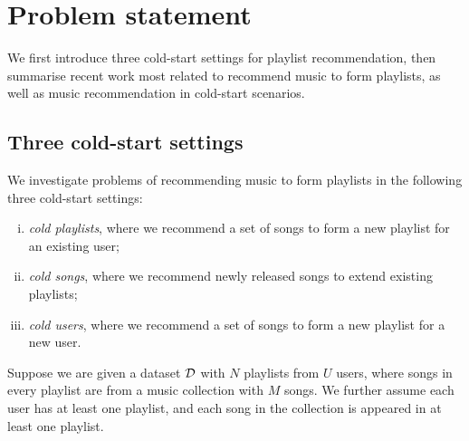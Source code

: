 \section{Problem statement}
\label{sec:problem}

We first introduce three cold-start settings for playlist recommendation, 
then summarise recent work most related to recommend music to form playlists,
as well as music recommendation in cold-start scenarios.



\subsection{Three cold-start settings}

We investigate problems of recommending music to form playlists in the following three cold-start settings:
\begin{enumerate}[(i)]
\item \emph{cold playlists}, where we recommend a set of songs to form a new playlist for an existing user;
\item \emph{cold songs}, where we recommend newly released songs to extend existing playlists;
\item \emph{cold users}, where we recommend a set of songs to form a new playlist for a new user.
\end{enumerate}


Suppose we are given a dataset $\mathcal{D}$ with $N$ playlists from $U$ users, 
where songs in every playlist are from a music collection with $M$ songs.
We further assume each user has at least one playlist, and each song in the collection 
is appeared in at least one playlist.

